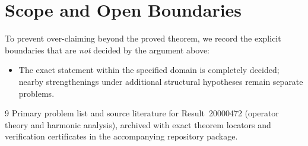 \documentclass[10pt,reqno]{amsart}
\theoremstyle{definition}
\begin{document}
\section{Scope and Open Boundaries}

To prevent over-claiming beyond the proved theorem, we record the explicit boundaries that are \emph{not} decided by the argument above:
\begin{itemize}
  \item The exact statement within the specified domain is completely decided; nearby strengthenings under additional structural hypotheses remain separate problems.
\end{itemize}

\begin{thebibliography}{9}
Primary problem list and source literature for Result~20000472 (operator theory and harmonic analysis), archived with exact theorem locators and verification certificates in the accompanying repository package.
\end{thebibliography}
\end{document}
